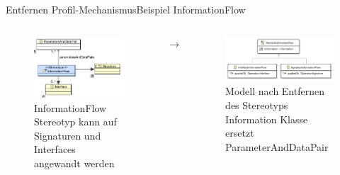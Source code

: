 \documentclass{sdqbeamer}
\begin{document}
\begin{frame}{Entfernen Profil-Mechanismus}{Beispiel InformationFlow}
	\begin{columns}
		\centering
		\begin{figure}
			\includegraphics[width=\textwidth]{images/repsoitory_stereotype.pdf}
			\caption{InformationFlow Stereotyp kann auf Signaturen und Interfaces angewandt werden}
		\end{figure}
		\centering
		\LARGE{$\rightarrow$}
		\centering
		\begin{figure}
			\includegraphics[width=\textwidth]{images/repository.pdf}
			\caption{Modell nach Entfernen des Stereotyps \linebreak Information Klasse ersetzt ParameterAndDataPair}
		\end{figure}
	\end{columns}
\end{frame}
\end{document}
